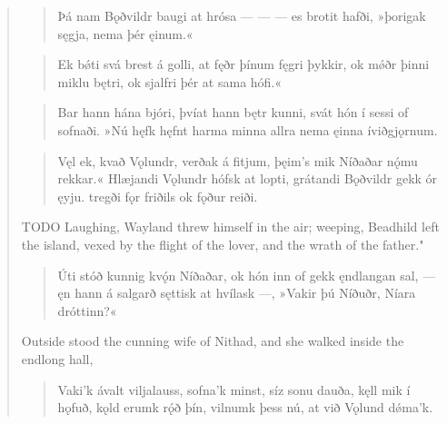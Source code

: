 \begin{verse}

\begin{verse}
\bva Þá nam Bǫðvildr \hld baugi at hrósa
— — — \hld es brotit hafði,
»þorigak sęgja, \hld nema þér ęinum.«  \\%
\end{verse}


\begin{verse}
\bva Ek bǿti svá \hld brest á golli,
at fęðr þínum \hld fęgri þykkir,
ok mǿðr þinni \hld miklu bętri,
ok sjalfri þér \hld at sama hófi.«  \\%
\end{verse}


\begin{verse}
\bva Bar hann hána bjóri, \hld þvíat hann bętr kunni,
svát hón í sessi \hld of sofnaði.
»Nú hęfk hęfnt \hld harma minna
allra nema ęinna \hld íviðgjǫrnum. \\%
\end{verse}


\begin{verse}
\bva Vęl ek, kvað Vǫlundr, \hld verðak á fitjum,
þęim's mik Níðaðar \hld nǫ́mu rekkar.« 
Hlæjandi Vǫlundr \hld hófsk at lopti,
grátandi Bǫðvildr \hld gekk ór ęyju.
tregði fǫr friðils \hld ok fǫður reiði. \\%
\end{verse}

\bvb TODO Laughing, Wayland threw himself in the air; weeping, Beadhild left the island, vexed by the flight of the lover, and the wrath of the father."

\begin{verse}
\bva Úti stóð kunnig \hld kvǫ́n Níðaðar,
ok hón inn of gekk \hld ęndlangan sal,
— ęn hann á salgarð \hld sęttisk at hvílask —,
»Vakir þú Níðuðr, \hld Níara dróttinn?«  \\%
\end{verse}

\bvb Outside stood the cunning wife of Nithad, and she walked inside the endlong hall,

\begin{verse}
\bva Vaki'k ávalt \hld viljalauss,
sofna'k minst, \hld síz sonu dauða,
kęll mik í hǫfuð, \hld kǫld erumk rǫ́ð þín,
vilnumk þess nú, \hld at við Vǫlund dǿma'k. \\%
\end{verse}


\end{verse}
